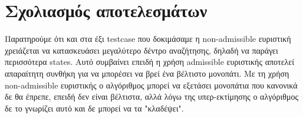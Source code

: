\documentclass[12pt]{article}
\begin{document}
\section{Σχολιασμός αποτελεσμάτων}
Παρατηρούμε ότι και στα έξι testcase που δοκιμάσαμε η non-admissible ευριστική χρειάζεται να κατασκευάσει μεγαλύτερο δέντρο αναζήτησης, δηλαδή να παράγει περισσότερα states. Αυτό συμβαίνει επειδή η χρήση admissible ευριστικής αποτελεί απαραίτητη συνθήκη για να μπορέσει να βρεί ένα βέλτιστο μονοπάτι. Με τη χρήση non-admissible ευριστικής ο αλγόριθμος μπορεί να εξετάσει μονοπάτια που κανονικά δε θα έπρεπε, επειδή δεν είναι βέλτιστα, αλλά λόγω της υπερ-εκτίμησης ο αλγόριθμος δε το γνωρίζει αυτό και δε μπορεί να τα "κλαδέψει".
\end{document}

